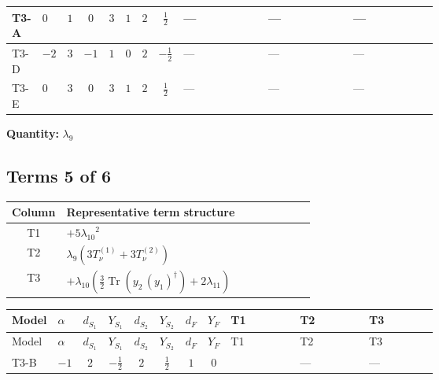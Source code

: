 \documentclass[8pt]{article}
\begin{document}
\begin{landscape}
\begin{longtable}{@{}llcccccc >{\raggedright\arraybackslash}p{0.21\linewidth} >{\raggedright\arraybackslash}p{0.21\linewidth} >{\raggedright\arraybackslash}p{0.21\linewidth}@{}}
\midrule
T3-A & $0$ & $1$ & $0$ & $3$ & $1$ & $2$ & $\frac{1}{2}$ & --- & --- & --- \\
\midrule
T3-D & $-2$ & $3$ & $-1$ & $1$ & $0$ & $2$ & $-\frac{1}{2}$ & --- & --- & --- \\
\midrule
T3-E & $0$ & $3$ & $0$ & $3$ & $1$ & $2$ & $\frac{1}{2}$ & --- & --- & --- \\
\midrule
\bottomrule
\end{longtable}
\clearpage
\noindent\textbf{Quantity: }$\lambda_{9}$\par\smallskip
\subsection*{Terms 5 of 6}
\begin{center}
\begin{tabular}{@{}c >{\raggedright\arraybackslash}p{0.82\linewidth}@{}}
\toprule
Column & Representative term structure \\
\midrule
T1 & \(\displaystyle +5 {\lambda_{10}}^2\) \\
\midrule
T2 & \(\displaystyle {\lambda_{9}} (3 T_{\nu}^{(1)}+3 T_{\nu}^{(2)})\) \\
\midrule
T3 & \(\displaystyle +{\lambda_{10}} \left(\frac{3}{2} \operatorname{Tr}\!\left({y_2}\,\left({y_1}\right)^{\dagger}\right)+2 {\lambda_{11}}\right)\) \\
\midrule
\bottomrule
\end{tabular}
\end{center}
\smallskip
\tiny
\begin{longtable}{@{}llcccccc >{\raggedright\arraybackslash}p{0.21\linewidth} >{\raggedright\arraybackslash}p{0.21\linewidth} >{\raggedright\arraybackslash}p{0.21\linewidth}@{}}
\toprule
Model & $\alpha$ & $d_{S_1}$ & $Y_{S_1}$ & $d_{S_2}$ & $Y_{S_2}$ & $d_F$ & $Y_F$ & T1 & T2 & T3 \\
\midrule
\endfirsthead
\toprule
Model & $\alpha$ & $d_{S_1}$ & $Y_{S_1}$ & $d_{S_2}$ & $Y_{S_2}$ & $d_F$ & $Y_F$ & T1 & T2 & T3 \\
\midrule
\endhead
T3-B & $-1$ & $2$ & $-\frac{1}{2}$ & $2$ & $\frac{1}{2}$ & $1$ & $0$ & \scriptsize\adjustbox{max width=\linewidth}{$\begin{gathered} +5 {\lambda_{10}}^2 \\ +5 {\lambda_{11}}^2\end{gathered}$} & --- & --- \\
\midrule

\end{longtable}
\end{landscape}
\end{document}
